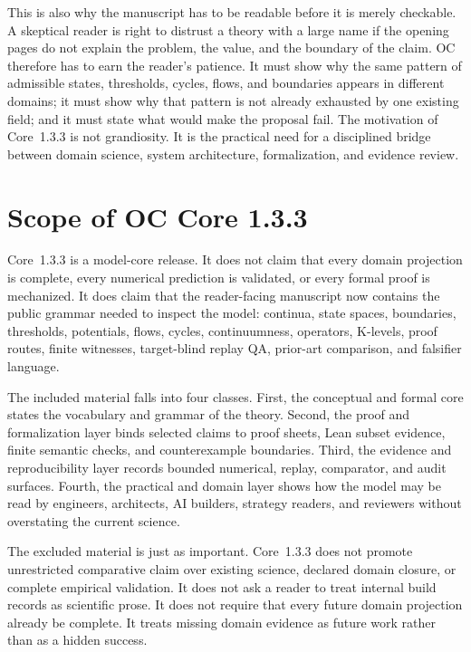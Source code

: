 This is also why the manuscript has to be readable before it is merely
checkable. A skeptical reader is right to distrust a theory with a large name if
the opening pages do not explain the problem, the value, and the boundary of
the claim. OC therefore has to earn the reader's patience. It must show why the
same pattern of admissible states, thresholds, cycles, flows, and boundaries
appears in different domains; it must show why that pattern is not already
exhausted by one existing field; and it must state what would make the proposal
fail. The motivation of Core~1.3.3 is not grandiosity. It is the practical need
for a disciplined bridge between domain science, system architecture,
formalization, and evidence review.

\section{Scope of OC Core 1.3.3}
\label{sec:r007-scope}

Core~1.3.3 is a model-core release. It does not claim that every domain
projection is complete, every numerical prediction is validated, or every
formal proof is mechanized. It does claim that the reader-facing manuscript now
contains the public grammar needed to inspect the model: continua, state
spaces, boundaries, thresholds, potentials, flows, cycles, continuumness,
operators, K-levels, proof routes, finite witnesses, target-blind replay QA,
prior-art comparison, and falsifier language.

The included material falls into four classes. First, the conceptual and formal
core states the vocabulary and grammar of the theory. Second, the proof and
formalization layer binds selected claims to proof sheets, Lean subset evidence,
finite semantic checks, and counterexample boundaries. Third, the evidence and
reproducibility layer records bounded numerical, replay, comparator, and audit
surfaces. Fourth, the practical and domain layer shows how the model may be read
by engineers, architects, AI builders, strategy readers, and reviewers without
overstating the current science.

The excluded material is just as important. Core~1.3.3 does not promote
unrestricted comparative claim over existing science, declared domain closure, or
complete empirical validation. It does not ask a reader to treat internal build
records as scientific prose. It does not require that every future domain
projection already be complete. It treats missing domain evidence as future
work rather than as a hidden success.

